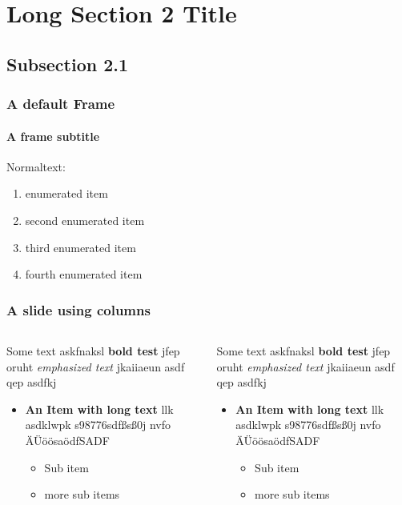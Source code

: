 \documentclass[german,aspectratio=169,titlestyle=white]{tudbeamer}
\begin{document}
\section[ShortSection2]{Long Section 2 Title}
\subsection{Subsection 2.1}
\begin{frame}
	\frametitle{A default Frame}
	\framesubtitle{A frame subtitle}

	Normaltext:
	\begin{enumerate}
		\item enumerated item
		\item second enumerated item
		\item third enumerated item
		\item fourth enumerated item
	\end{enumerate}
\end{frame}
\begin{frame}
	\frametitle{A slide using columns}
	\begin{columns}
	   	\begin{column}{.5\textwidth}
	   		Some text askfnaksl \textbf{bold test} jfep oruht \emph{emphasized text} jkaiiaeun asdf qep  asdfkj  
	   		\begin{itemize}
	   			\item \textbf{An Item with long text} llk asdklwpk s98776sdfßsß0j nvfo ÄÜöösaödfSADF
	   			\begin{itemize}
	   				\item Sub item
	   				\item more sub items
	   			\end{itemize}
	   		\end{itemize}
		\end{column}
	   	\begin{column}{.5\textwidth}
	   		Some text askfnaksl \textbf{bold test} jfep oruht \emph{emphasized text} jkaiiaeun asdf qep  asdfkj  
	   		\begin{itemize}
	   			\item \textbf{An Item with long text} llk asdklwpk s98776sdfßsß0j nvfo ÄÜöösaödfSADF
	   			\begin{itemize}
	   				\item Sub item
	   				\item more sub items
	   			\end{itemize}
	   		\end{itemize}
		\end{column}
	\end{columns}
\end{frame}
\end{document}
